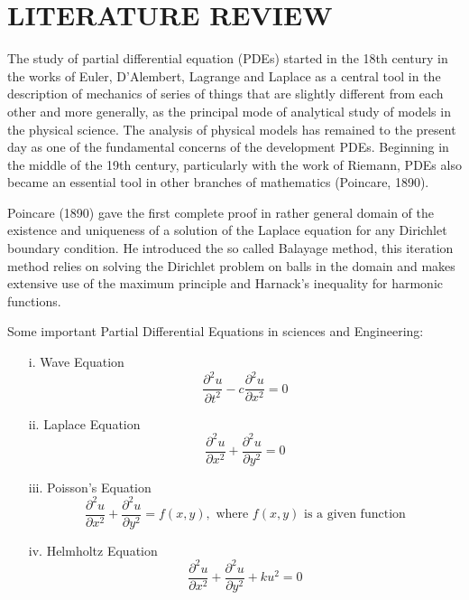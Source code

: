 \documentclass[12pt]{report}
\begin{document}
\chapter{LITERATURE REVIEW}
\qquad The study of partial differential equation (PDEs) started in the 18th century in the works of Euler, D'Alembert, Lagrange and Laplace as a central tool in the description of mechanics of series of  things that are slightly different from each other and more generally, as the principal mode of analytical study of models in the physical science. The analysis of physical models has remained to the present day as one of the fundamental concerns of the development PDEs. Beginning in the middle of the 19th century, particularly with the work of Riemann, PDEs also became an essential tool in other branches of mathematics (Poincare, 1890).\\
\par Poincare (1890) gave the first complete proof in rather general domain of the existence and uniqueness of a solution of the Laplace equation for any Dirichlet boundary condition. He introduced the so called Balayage method, this iteration method relies on solving the Dirichlet problem on balls in the domain and makes extensive use of the maximum principle and Harnack's inequality for harmonic functions.\\
\par Some important Partial Differential Equations in sciences and Engineering:
\begin{enumerate}
	\item[i.] Wave Equation
  \begin{equation}
  \frac{\partial ^2 u}{\partial t^2}-c \frac{\partial^2u}{\partial x^2}=0
  \end{equation}
  \item[ii.] Laplace Equation
  \begin{equation}
  \frac{\partial^2 u}{\partial x^2}+\frac{\partial^2 u}{\partial y^2}=0
  \end{equation}
  \item[iii.] Poisson's Equation
  \begin{equation}
  \frac{\partial^2 u}{\partial x^2}+\frac{\partial^2 u}{\partial y^2}=f(x,y), \mbox{ where } f(x,y) \mbox{ is a given function}
  \end{equation}
  \item[iv.] Helmholtz Equation
  \begin{equation}
  \frac{\partial^2 u}{\partial x^2}+\frac{\partial^2 u}{\partial y^2}+ku^2=0
  \end{equation}
  \end{enumerate}
\end{document}
